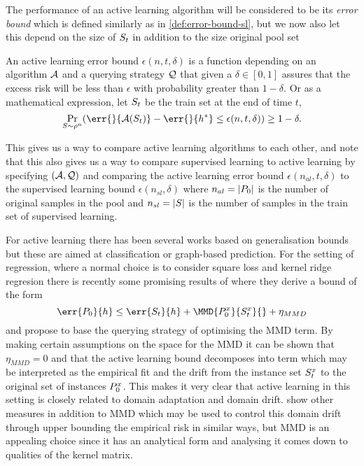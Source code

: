 The performance of an active learning algorithm will be considered to be its
\emph{error bound} which is defined similarly as in \ref{def:error-bound-sl},
but we now also let this depend on the size of \(S_{t}\) in addition to
the size original pool set
\begin{definition}
  \label{def:error-bound-al} An active learning error bound \(\epsilon(n, t,
\delta)\) is a function depending on an algorithm \(\mathcal{A}\) and a querying
strategy \(\mathcal{Q}\) that given a \(\delta \in [0, 1]\) assures that the
excess risk will be less than \(\epsilon\) with probability greater than \(1 -
\delta\). Or as a mathematical expression, let \(S_{t}\) be the train
set at the end of time \(t\),
  \begin{equation}
  \label{eq:error-bound-al} \Pr_{S \sim \rho^n}(\err{}{\algo(S_{t})} -
\err{}{h^{\ast}} \leq \epsilon(n, t, \delta)) \geq 1 - \delta.
  \end{equation}
\end{definition} This gives us a way to compare active learning algorithms to
each other, and note that this also gives us a way to compare supervised
learning to active learning by specifying \((\mathcal{A}, \mathcal{Q})\) and comparing
the active learning error bound \(\epsilon(n_{al}, t, \delta)\) to the
supervised learning bound \(\epsilon(n_{sl}, \delta)\) where \(n_{al} =
|P_{0}|\) is the number of original samples in the pool and \(n_{sl} =
|S|\) is the number of samples in the train set of supervised learning.

For active learning there has been several works based on generalisation bounds
\cite{ganti12_upal,xu19_towar_effic_evaluat_risk_via_herdin,gu12_towar} but
these are aimed at classification or graph-based prediction. For the setting of
regression, where a normal choice is to consider square loss and kernel ridge
regresion there is recently some promising results of
\cite{viering17_nuclear_discr_activ_learn} where they derive a bound of the form
\begin{equation}
\label{eq:viering-mmd-gen-bound} \err{\poolset_{0}}{h} \leq
\err{\trainset_{t}}{h} + \MMD{\poolsetx_{0}}{\trainsetx_{t}}{} + \eta_{MMD}
\end{equation} and propose to base the querying strategy of optimising the MMD
term. By making certain assumptions on the space for the MMD it can be shown
that \(\eta_{MMD} = 0\) and that the active learning bound decomposes into term
which may be interpreted as the empirical fit and the drift from the instance
set \(S^x_{t}\) to the original set of instances \(P^x_{0}\). This
makes it very clear that active learning in this setting is closely related to
domain adaptation and domain drift. \cite{cortes19_adapt_based_gener_discr} show
other measures in addition to MMD which may be used to control this domain drift
through upper bounding the empirical risk in similar ways, but MMD is an
appealing choice since it has an analytical form and analysing it comes down to
qualities of the kernel matrix.

